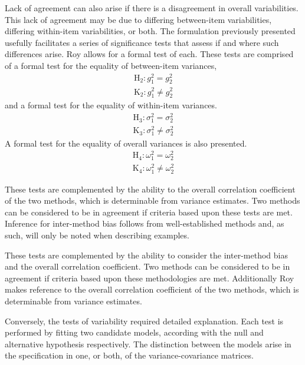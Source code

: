 \documentclass[12pt, a4paper]{report}
\theoremstyle{plain}
\theoremstyle{definition}
\theoremstyle{remark}
\begin{document}
Lack of agreement can also arise if there is a disagreement in overall variabilities. This lack of agreement may be due to differing between-item variabilities, differing within-item variabilities, or both. The formulation previously presented usefully facilitates a series of significance tests that assess if and where such differences arise. Roy allows for a formal test of each. These tests are comprised of a formal test for the equality of between-item variances,
\begin{eqnarray*}
	\operatorname{H_2} : g^2_1 = g^2_2 \\
	\operatorname{K_2} : g^2_1 \neq g^2_2
\end{eqnarray*}
and a formal test for the equality of within-item variances.
\begin{eqnarray*}
	\operatorname{H_3} : \sigma^2_1 = \sigma^2_2 \\
	\operatorname{K_3} : \sigma^2_1 \neq \sigma^2_2
\end{eqnarray*}
A formal test for the equality of overall variances is also presented.
\begin{eqnarray*}
	\operatorname{H_4} : \omega^2_1 = \omega^2_2 \\
	\operatorname{K_4} : \omega^2_1 \neq \omega^2_2
\end{eqnarray*}

These tests are complemented by the ability to the overall correlation coefficient of the two methods, which is determinable from variance estimates. Two methods can be considered to be in agreement if criteria based upon these tests are met. Inference for inter-method bias follows from well-established methods and, as such, will only be noted when describing examples.

These tests are complemented by the ability to consider the inter-method bias and the overall correlation coefficient.
Two methods can be considered to be in agreement if criteria based upon these methodologies are met. Additionally Roy makes reference to the overall correlation coefficient of the two methods, which is determinable from variance estimates.

Conversely, the tests of variability required detailed explanation. Each test is performed by fitting two candidate models, according with the null and alternative hypothesis respectively. The distinction between the models arise in the specification in one, or both, of the variance-covariance matrices. %
\end{document}
